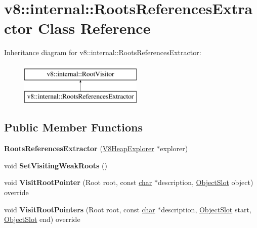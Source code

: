 \hypertarget{classv8_1_1internal_1_1RootsReferencesExtractor}{}\section{v8\+:\+:internal\+:\+:Roots\+References\+Extractor Class Reference}
\label{classv8_1_1internal_1_1RootsReferencesExtractor}
Inheritance diagram for v8\+:\+:internal\+:\+:Roots\+References\+Extractor\+:\begin{figure}[H]
\begin{center}
\leavevmode
\includegraphics[height=2.000000cm]{classv8_1_1internal_1_1RootsReferencesExtractor}
\end{center}
\end{figure}
\subsection*{Public Member Functions}
\begin{DoxyCompactItemize}
\item 
\mbox{\label{classv8_1_1internal_1_1RootsReferencesExtractor_a051ce77193c457da41f9a7bb84107fdc}} 
{\bfseries Roots\+References\+Extractor} (\mbox{\hyperlink{classv8_1_1internal_1_1V8HeapExplorer}{V8\+Heap\+Explorer}} $\ast$explorer)
\item 
\mbox{\label{classv8_1_1internal_1_1RootsReferencesExtractor_ad38cd5c3a6833989f0c1b8396f756a7e}} 
void {\bfseries Set\+Visiting\+Weak\+Roots} ()
\item 
\mbox{\label{classv8_1_1internal_1_1RootsReferencesExtractor_a3aedb09fc9bfe24d48eea681c83cc9ca}} 
void {\bfseries Visit\+Root\+Pointer} (Root root, const \mbox{\hyperlink{classchar}{char}} $\ast$description, \mbox{\hyperlink{classv8_1_1internal_1_1ObjectSlot}{Object\+Slot}} object) override
\item 
\mbox{\label{classv8_1_1internal_1_1RootsReferencesExtractor_a2e8d61aaaaa7a41c66016dc2c999c673}} 
void {\bfseries Visit\+Root\+Pointers} (Root root, const \mbox{\hyperlink{classchar}{char}} $\ast$description, \mbox{\hyperlink{classv8_1_1internal_1_1ObjectSlot}{Object\+Slot}} start, \mbox{\hyperlink{classv8_1_1internal_1_1ObjectSlot}{Object\+Slot}} end) override
\end{DoxyCompactItemize}
